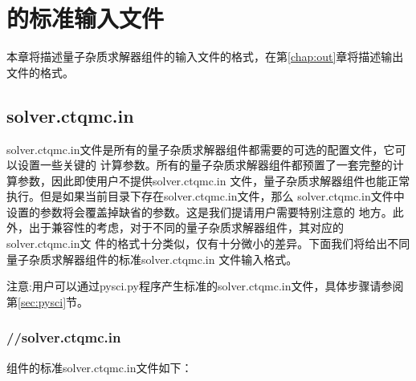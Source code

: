 \chapter{{\iqist}的标准输入文件}
\label{chap:inf}

本章将描述量子杂质求解器组件的输入文件的格式，在第\ref{chap:out}章将描述输出文件的格式。

\section{solver.ctqmc.in}
\label{sec:sci}

solver.ctqmc.in文件是所有的量子杂质求解器组件都需要的可选的配置文件，它可以设置一些关键的
计算参数。所有的量子杂质求解器组件都预置了一套完整的计算参数，因此即使用户不提供solver.ctqmc.in
文件，量子杂质求解器组件也能正常执行。但是如果当前目录下存在solver.ctqmc.in文件，那么
solver.ctqmc.in文件中设置的参数将会覆盖掉缺省的参数。这是我们提请用户需要特别注意的
地方。此外，出于兼容性的考虑，对于不同的量子杂质求解器组件，其对应的solver.ctqmc.in文
件的格式十分类似，仅有十分微小的差异。下面我们将给出不同量子杂质求解器组件的标准solver.ctqmc.in
文件输入格式。

注意:用户可以通过pysci.py程序产生标准的solver.ctqmc.in文件，具体步骤请参阅第\ref{sec:pysci}节。

\subsection{{\azalea}//solver.ctqmc.in}

{\azalea}组件的标准solver.ctqmc.in文件如下：

